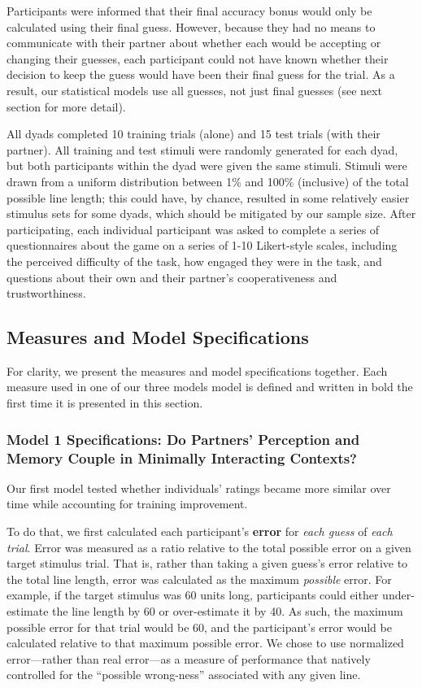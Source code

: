 \documentclass[10pt, letterpaper]{article}
\begin{document}
Participants were informed that their final accuracy bonus would only be
calculated using their final guess. However, because they had no means
to communicate with their partner about whether each would be accepting
or changing their guesses, each participant could not have known whether
their decision to keep the guess would have been their final guess for
the trial. As a result, our statistical models use all guesses, not just
final guesses (see next section for more detail).

All dyads completed 10 training trials (alone) and 15 test trials (with
their partner). All training and test stimuli were randomly generated
for each dyad, but both participants within the dyad were given the same
stimuli. Stimuli were drawn from a uniform distribution between 1\% and
100\% (inclusive) of the total possible line length; this could have, by
chance, resulted in some relatively easier stimulus sets for some dyads,
which should be mitigated by our sample size. After participating, each
individual participant was asked to complete a series of questionnaires
about the game on a series of 1-10 Likert-style scales, including the
perceived difficulty of the task, how engaged they were in the task, and
questions about their own and their partner's cooperativeness and
trustworthiness.

\subsection{Measures and Model
Specifications}\label{measures-and-model-specifications}

For clarity, we present the measures and model specifications together.
Each measure used in one of our three models model is defined and
written in bold the first time it is presented in this section.

\subsubsection{Model 1 Specifications: Do Partners' Perception and
Memory Couple in Minimally Interacting
Contexts?}\label{model-1-specifications-do-partners-perception-and-memory-couple-in-minimally-interacting-contexts}

Our first model tested whether individuals' ratings became more similar
over time while accounting for training improvement.

To do that, we first calculated each participant's \textbf{error} for
\emph{each guess} of \emph{each trial}. Error was measured as a ratio
relative to the total possible error on a given target stimulus trial.
That is, rather than taking a given guess's error relative to the total
line length, error was calculated as the maximum \emph{possible} error.
For example, if the target stimulus was 60 units long, participants
could either under-estimate the line length by 60 or over-estimate it by
40. As such, the maximum possible error for that trial would be 60, and
the participant's error would be calculated relative to that maximum
possible error. We chose to use normalized error---rather than real
error---as a measure of performance that natively controlled for the
``possible wrong-ness'' associated with any given line.
\end{document}
